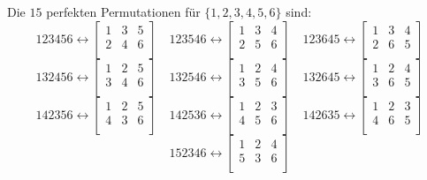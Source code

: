 \begin{flushenum}
\newcommand{\lr}{\leftrightarrow}
\item
	Die $15$ perfekten Permutationen für $\{1, 2, 3, 4, 5, 6\}$ sind:
	\[
		123456 \lr
		\begin{bmatrix}
			1 & 3 & 5 \\
			2 & 4 & 6\\
		\end{bmatrix} \quad
		123546 \lr
		\begin{bmatrix}
			1 & 3 & 4 \\
			2 & 5 & 6 \\
		\end{bmatrix} \quad
		123645 \lr
		\begin{bmatrix}
			1 & 3 & 4 \\
			2 & 6 & 5 \\
		\end{bmatrix}
	\]
	\[
		132456 \lr
		\begin{bmatrix}
			1 & 2 & 5 \\
			3 & 4 & 6 \\
		\end{bmatrix} \quad
		132546 \lr
		\begin{bmatrix}
			1 & 2 & 4 \\
			3 & 5 & 6 \\
		\end{bmatrix} \quad
		132645 \lr
		\begin{bmatrix}
			1 & 2 & 4 \\
			3 & 6 & 5 \\
		\end{bmatrix}
	\]
	\[
		142356 \lr
		\begin{bmatrix}
			1 & 2 & 5 \\
			4 & 3 & 6 \\
		\end{bmatrix} \quad
		142536 \lr
		\begin{bmatrix}
			1 & 2 & 3 \\
			4 & 5 & 6 \\
		\end{bmatrix} \quad
		142635 \lr
		\begin{bmatrix}
			1 & 2 & 3 \\
			4 & 6 & 5 \\
		\end{bmatrix}
	\]
	\[
		152346 \lr
		\begin{bmatrix}
			1 & 2 & 4 \\
			5 & 3 & 6 \\

\end{bmatrix}\]
\end{flushenum}
